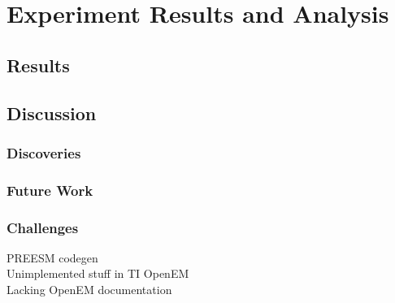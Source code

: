 \chapter{Experiment Results and Analysis}
\label{chapter:results-and-analysis}

\section{Results}
\label{sec:results}


\section{Discussion}
\label{sec:discussion}


\subsection{Discoveries}
\label{subsec:discoveries}


\subsection{Future Work}
\label{subsec:future-work}

\subsection{Challenges}
\label{subsec:challenges}
PREESM codegen \\
Unimplemented stuff in TI OpenEM \\
Lacking OpenEM documentation

